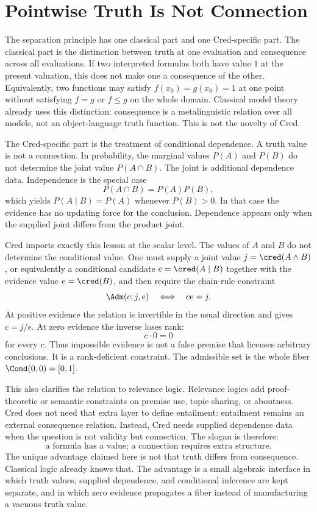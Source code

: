 \section{Pointwise Truth Is Not Connection}
\label{sec:pointwise-truth-connection}

The separation principle has one classical part and one Cred-specific
part.  The classical part is the distinction between truth at one
evaluation and consequence across all evaluations.  If two interpreted
formulas both have value $1$ at the present valuation, this does not
make one a consequence of the other.  Equivalently, two functions may
satisfy $f(x_0)=g(x_0)=1$ at one point without satisfying $f=g$ or
$f\le g$ on the whole domain.  Classical model theory already uses
this distinction: consequence is a metalinguistic relation over all
models, not an object-language truth function.  This is not the novelty
of Cred.

The Cred-specific part is the treatment of conditional dependence.  A
truth value is not a connection.  In probability, the marginal values
$P(A)$ and $P(B)$ do not determine the joint value $P(A\cap B)$.  The
joint is additional dependence data.  Independence is the special case
\[
  P(A\cap B)=P(A)P(B),
\]
which yields $P(A\mid B)=P(A)$ whenever $P(B)>0$.  In that case the
evidence has no updating force for the conclusion.  Dependence appears
only when the supplied joint differs from the product joint.

Cred imports exactly this lesson at the scalar level.  The values of
$A$ and $B$ do not determine the conditional value.  One must supply a
joint value $j=\cred(A\land B)$, or equivalently a conditional candidate
$c=\cred(A\mid B)$ together with the evidence value $e=\cred(B)$, and
then require the chain-rule constraint
\[
  \Adm(c;j,e)\quad\Longleftrightarrow\quad c e=j.
\]
At positive evidence the relation is invertible in the usual direction
and gives $c=j/e$.  At zero evidence the inverse loses rank:
\[
  c\cdot 0=0
\]
for every $c$.  Thus impossible evidence is not a false premise that
licenses arbitrary conclusions.  It is a rank-deficient constraint.
The admissible set is the whole fiber $\Cond(0,0)=[0,1]$.

This also clarifies the relation to relevance logic.  Relevance logics
add proof-theoretic or semantic constraints on premise use, topic
sharing, or aboutness.  Cred does not need that extra layer to define
entailment: entailment remains an external consequence relation.
Instead, Cred needs supplied dependence data when the question is not
validity but connection.  The slogan is therefore:
\[
\boxed{\text{a formula has a value; a connection requires extra structure.}}
\]
The unique advantage claimed here is not that truth differs from
consequence.  Classical logic already knows that.  The advantage is a
small algebraic interface in which truth values, supplied dependence,
and conditional inference are kept separate, and in which zero evidence
propagates a fiber instead of manufacturing a vacuous truth value.
